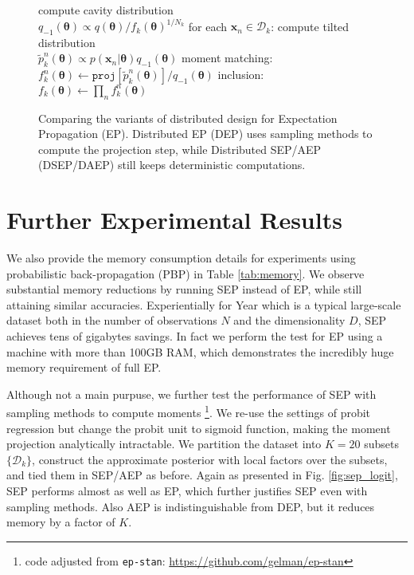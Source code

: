 \documentclass{article} %
\begin{document}
\begin{figure}[!t]
\begin{minipage}[t]{0.33\linewidth}
\begin{algorithm}[H]
\begin{algorithmic}[1]
	\STATE compute cavity distribution \\ $q_{-1}(\bm{\theta}) \propto q(\bm{\theta}) / f_k(\bm{\theta})^{1 / N_k}$
	\STATE for each $\bm{x}_n \in \mathcal{D}_k$:
	\STATE \quad compute tilted distribution \\$\tilde{p}_k^n(\bm{\theta}) \propto p(\bm{x}_n|\bm{\theta}) q_{-1}(\bm{\theta})$
	\STATE \quad moment matching: \\\hspace{-1mm}$f_k^n(\bm{\theta}) \leftarrow \mathtt{proj}[\tilde{p}_k^n(\bm{\theta})] / q_{-1}(\bm{\theta}) $
	\STATE inclusion:\\ $f_k(\bm{\theta}) \leftarrow \prod_n f_k^n(\bm{\theta})$
\end{algorithmic}
\end{algorithm}
\end{minipage} 
%
\caption{Comparing the variants of distributed design for Expectation Propagation (EP). Distributed EP (DEP) uses sampling methods to compute the projection step, while Distributed SEP/AEP (DSEP/DAEP) still keeps deterministic computations.}
\end{figure}

\section{Further Experimental Results}

We also provide the memory consumption details for experiments using probabilistic back-propagation (PBP) in Table \ref{tab:memory}. We observe substantial memory reductions by running SEP instead of EP, while still attaining similar accuracies. Experientially for Year which is a typical large-scale dataset both in the number of observations $N$ and the dimensionality $D$, SEP achieves tens of gigabytes savings. In fact we perform the test for EP using a machine with more than 100GB RAM, which demonstrates the incredibly huge memory requirement of full EP. 

Although not a main purpuse, we further test the performance of SEP with sampling methods to compute moments \footnote{code adjusted from \texttt{ep-stan}: \url{https://github.com/gelman/ep-stan}}. We re-use the settings of probit regression but change the probit unit to sigmoid function, making the moment projection analytically intractable. We partition the dataset into $K = 20$ subsets $\{\mathcal{D}_k\}$, construct the approximate posterior with local factors over the subsets, and tied them in SEP/AEP as before. Again as presented in Fig. \ref{fig:sep_logit}, SEP performs almost as well as EP, which further justifies SEP even with sampling methods. Also AEP is indistinguishable from DEP, but it reduces memory by a factor of $K$.
\end{document}
